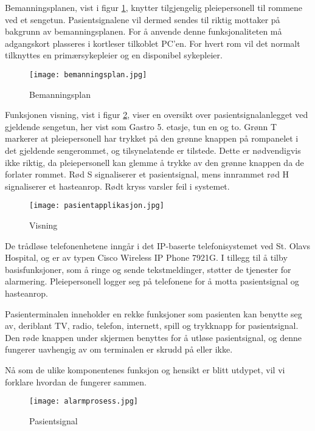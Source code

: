 \noindent
Bemanningsplanen, vist i figur \ref{bemanningsplan}, knytter tilgjengelig pleiepersonell til rommene ved et sengetun. Pasientsignalene vil dermed sendes til riktig mottaker på bakgrunn av bemanningsplanen. For å anvende denne funksjonaliteten må adgangskort plasseres i kortleser tilkoblet PC'en. For hvert rom vil det normalt tilknyttes en primærsykepleier og en disponibel sykepleier.
\begin{figure}[H]
\centering
\texttt{[image: bemanningsplan.jpg]}
\caption{Bemanningsplan}
\label{bemanningsplan}
\end{figure}
\noindent
Funksjonen visning, vist i figur \ref{visning}, viser en oversikt over pasientsignalanlegget ved gjeldende sengetun, her vist som Gastro 5. etasje, tun en og to. Grønn T markerer at pleiepersonell har trykket på den grønne knappen på rompanelet i det gjeldende sengerommet, og tilsynelatende er tilstede. Dette er nødvendigvis ikke riktig, da pleiepersonell kan glemme å trykke av den grønne knappen da de forlater rommet. Rød S signaliserer et pasientsignal, mens innrammet rød H signaliserer et hasteanrop. Rødt kryss varsler feil i systemet.
\begin{figure}[H]
\centering
\texttt{[image: pasientapplikasjon.jpg]}
\caption{Visning}
\label{visning}
\end{figure}
\noindent
De trådløse telefonenhetene inngår i det IP-baserte telefonisystemet ved St. Olavs Hospital, og er av typen Cisco Wireless IP Phone 7921G. I tillegg til å tilby basisfunksjoner, som å ringe og sende tekstmeldinger, støtter de tjenester for alarmering. Pleiepersonell logger seg på telefonene for å motta pasientsignal og hasteanrop.

\noindent
Pasienterminalen inneholder en rekke funksjoner som pasienten kan benytte seg av, deriblant TV, radio, telefon, internett, spill og trykknapp for pasientsignal. Den røde knappen under skjermen benyttes for å utløse pasientsignal, og denne fungerer uavhengig av om terminalen er skrudd på eller ikke.

\noindent
Nå som de ulike komponentenes funksjon og hensikt er blitt utdypet, vil vi forklare hvordan de fungerer sammen. 

\begin{figure}[H]
\centering
\texttt{[image: alarmprosess.jpg]}
\caption{Pasientsignal}
\label{alarmprosess}
\end{figure}













